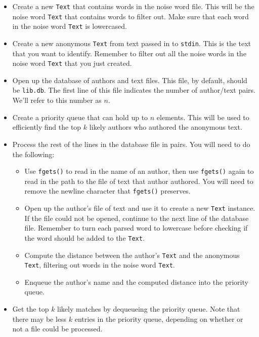 \begin{itemize}
  \item Create a new \texttt{Text} that contains words in the noise word file.
    This will be the noise word \texttt{Text} that contains words to filter out.
    Make sure that each word in the noise word \texttt{Text} is lowercased.
  \item Create a new anonymous \texttt{Text} from text passed in to
    \texttt{stdin}. This is the text that you want to identify. Remember to
    filter out all the noise words in the noise word \texttt{Text} that you just
    created.
  \item Open up the database of authors and text files. This file, by default,
    should be \texttt{lib.db}. The first line of this file indicates the number
    of author/text pairs. We'll refer to this number as $n$.
  \item Create a priority queue that can hold up to $n$ elements. This will be
    used to efficiently find the top $k$ likely authors who authored the
    anonymous text.
  \item Process the rest of the lines in the database file in pairs. You will
    need to do the following:
    \begin{itemize}
      \item Use \texttt{fgets()} to read in the name of an author, then use
        \texttt{fgets()} again to read in the path to the file of text that
        author authored. You will need to remove the newline character that
        \texttt{fgets()} preserves.
      \item Open up the author's file of text and use it to create a new
        \texttt{Text} instance. If the file could not be opened, continue to the
        next line of the database file. Remember to turn each parsed word to
        lowercase before checking if the word should be added to the
        \texttt{Text}.
      \item Compute the distance between the author's \texttt{Text} and the
        anonymous \texttt{Text}, filtering out words in the noise word
        \texttt{Text}.
      \item Enqueue the author's name and the computed distance into the
        priority queue.
    \end{itemize}
  \item Get the top $k$ likely matches by dequeueing the priority queue. Note
    that there may be less $k$ entries in the priority queue, depending on
    whether or not a file could be processed.
\end{itemize}

